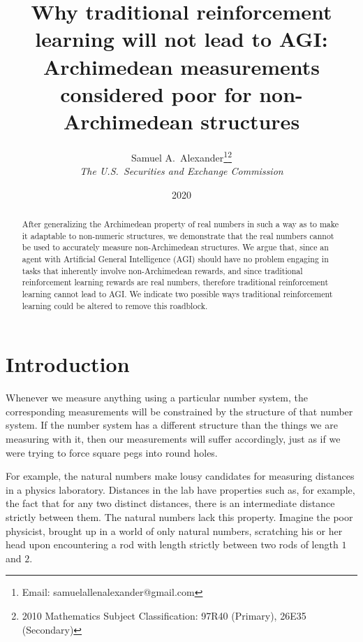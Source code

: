 \documentclass[reqno]{article}
\theoremstyle{definition}
\begin{document}
\title{Why traditional reinforcement learning will not lead to AGI:
Archimedean measurements considered poor for non-Archimedean structures}

\author{Samuel A.~Alexander\thanks{Email:
samuelallenalexander@gmail.com}\hphantom{*}\footnote{2010 Mathematics 
Subject Classification: 97R40 (Primary), 26E35 (Secondary)}\\
\emph{The U.S.\ Securities and Exchange Commission}}
\date{2020}
\maketitle

\begin{abstract}
    After generalizing the Archimedean property of real numbers in such a
    way as to make it adaptable to non-numeric structures, we demonstrate
    that the real numbers cannot be used to accurately measure non-Archimedean
    structures. We argue that, since an agent with Artificial General
    Intelligence (AGI) should have no problem engaging in tasks that inherently
    involve non-Archimedean rewards, and since traditional reinforcement
    learning rewards are real numbers, therefore traditional reinforcement
    learning cannot lead to AGI. We indicate two possible ways traditional
    reinforcement learning could be altered to remove this roadblock.
\end{abstract}

\section{Introduction}

Whenever we measure anything using a particular number system, the
corresponding measurements will be constrained by the structure of that
number system. If the number system has a different structure than
the things we are measuring with it, then our
measurements will suffer accordingly, just as if we were trying to
force square pegs into round holes.

For example, the natural numbers make lousy candidates for measuring
distances in a physics laboratory. Distances in the lab have
properties such as, for example, the fact that for any two distinct
distances, there is an intermediate distance strictly between them.
The natural numbers lack this property. Imagine the poor physicist,
brought up in a world of only natural numbers, scratching his or her
head upon encountering a rod with length strictly between two rods
of length $1$ and $2$.
\end{document}
